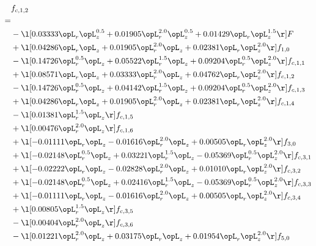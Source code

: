 \begin{alignat}{2} 
\label{eq:f_12_1} 
& f_{c,1,2} \nonumber \\ 
 = \\ 
& - \l[  0.03333 \opL_r \opL_z^{0.5} +  0.01905 \opL_r^{2.0} \opL_z^{0.5} +  0.01429 \opL_r \opL_z^{1.5}  \r] F \nonumber \\ 
& + \l[  0.04286 \opL_r \opL_z +  0.01905 \opL_r^{2.0} \opL_z +  0.02381 \opL_r \opL_z^{2.0}  \r] f_{1,0} \nonumber \\ 
& - \l[  0.14726 \opL_r^{0.5} \opL_z +  0.05522 \opL_r^{1.5} \opL_z +  0.09204 \opL_r^{0.5} \opL_z^{2.0}  \r] f_{c,1,1} \nonumber \\ 
& + \l[  0.08571 \opL_r \opL_z +  0.03333 \opL_r^{2.0} \opL_z +  0.04762 \opL_r \opL_z^{2.0}  \r] f_{c,1,2} \nonumber \\ 
& - \l[  0.14726 \opL_r^{0.5} \opL_z +  0.04142 \opL_r^{1.5} \opL_z +  0.09204 \opL_r^{0.5} \opL_z^{2.0}  \r] f_{c,1,3} \nonumber \\ 
& + \l[  0.04286 \opL_r \opL_z +  0.01905 \opL_r^{2.0} \opL_z +  0.02381 \opL_r \opL_z^{2.0}  \r] f_{c,1,4} \nonumber \\ 
& - \l[  0.01381 \opL_r^{1.5} \opL_z  \r] f_{c,1,5} \nonumber \\ 
& + \l[  0.00476 \opL_r^{2.0} \opL_z  \r] f_{c,1,6} \nonumber \\ 
& + \l[  -0.01111 \opL_r \opL_z   -0.01616 \opL_r^{2.0} \opL_z +  0.00505 \opL_r \opL_z^{2.0}  \r] f_{3,0} \nonumber \\ 
& + \l[  -0.02148 \opL_r^{0.5} \opL_z +  0.03221 \opL_r^{1.5} \opL_z   -0.05369 \opL_r^{0.5} \opL_z^{2.0}  \r] f_{c,3,1} \nonumber \\ 
& + \l[  -0.02222 \opL_r \opL_z   -0.02828 \opL_r^{2.0} \opL_z +  0.01010 \opL_r \opL_z^{2.0}  \r] f_{c,3,2} \nonumber \\ 
& + \l[  -0.02148 \opL_r^{0.5} \opL_z +  0.02416 \opL_r^{1.5} \opL_z   -0.05369 \opL_r^{0.5} \opL_z^{2.0}  \r] f_{c,3,3} \nonumber \\ 
& + \l[  -0.01111 \opL_r \opL_z   -0.01616 \opL_r^{2.0} \opL_z +  0.00505 \opL_r \opL_z^{2.0}  \r] f_{c,3,4} \nonumber \\ 
& + \l[  0.00805 \opL_r^{1.5} \opL_z  \r] f_{c,3,5} \nonumber \\ 
& - \l[  0.00404 \opL_r^{2.0} \opL_z  \r] f_{c,3,6} \nonumber \\ 
& - \l[  0.01221 \opL_r^{2.0} \opL_z +  0.03175 \opL_r \opL_z +  0.01954 \opL_r \opL_z^{2.0}  \r] f_{5,0} \nonumber \\ 

\end{alignat}

